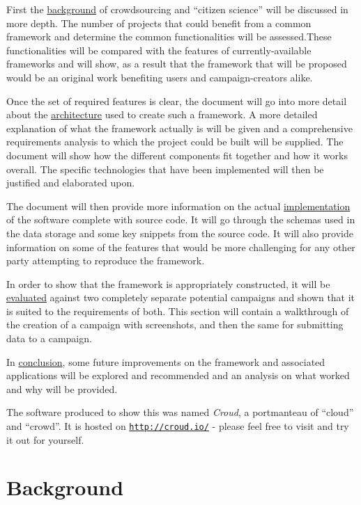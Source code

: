 \documentclass{article}
\let\oldsection\section
\renewcommand\section{\clearpage\oldsection}
\begin{document}
		First the \hyperref[sec:background]{background} of crowdsourcing and ``citizen science'' will be discussed in more depth. The number of projects that could benefit from a common framework and determine the common functionalities will be assessed.These functionalities will be compared with the features of currently-available frameworks and will show, as a result that the framework that will be proposed would be an original work benefiting users and campaign-creators alike.

		Once the set of required features is clear, the document will go into more detail about the \hyperref[sec:architecture]{architecture} used to create such a framework. A more detailed explanation of what the framework actually is will be given and a comprehensive requirements analysis to which the project could be built will be supplied. The document will show how the different components fit together and how it works overall. The specific technologies that have been implemented will then be justified and elaborated upon.

		The document will then provide more information on the actual \hyperref[sec:implementation]{implementation} of the software complete with source code. It will go through the schemas used in the data storage and some key snippets from the source code. It will also provide information on some of the features that would be more challenging for any other party attempting to reproduce the framework.

		In order to show that the framework is appropriately constructed, it will be \hyperref[sec:evaluation]{evaluated} against two completely separate potential campaigns and shown that it is suited to the requirements of both. This section will contain a walkthrough of the creation of a campaign with screenshots, and then the same for submitting data to a campaign.

		In \hyperref[sec:conclusion]{conclusion}, some future improvements on the framework and associated applications will be explored and recommended and an analysis on what worked and why will be provided.

		The software produced to show this was named \emph{Croud}, a portmanteau of ``cloud'' and ``crowd''. It is hosted on \href{http://croud.io/}{\nolinkurl{http://croud.io/}} - please feel free to visit and try it out for yourself.

	\section{Background}
	\label{sec:background}
\end{document}
